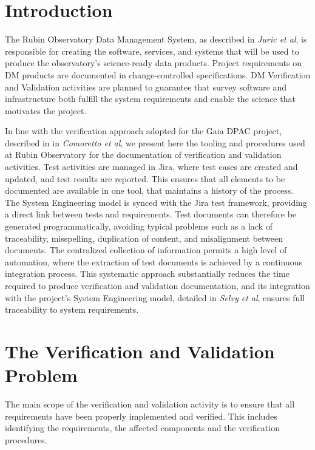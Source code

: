 \section{Introduction}

The Rubin Observatory Data Management System, as described in \textit{Juric et al}\cite{2015arXiv151207914J},
is responsible for creating the software, services, and systems that will be used to
produce the observatory's science-ready data products.  Project requirements on DM
products are documented in change-controlled specifications. DM Verification and Validation activities are planned
to guarantee that survey software and infrastructure both fulfill the system requirements and enable the science that
motivates the project.

In line with the verification approach adopted for the Gaia DPAC project, described in in \textit{Comoretto et al}\cite{10.1117/12.926797}, 
we present here the tooling and procedures used at Rubin Observatory for the documentation of verification and
validation activities. Test activities are managed in Jira, where test cases are created and updated, and test results
are reported. This ensures that all elements to be documented are available in one tool, that maintains a history of
the process. The System Engineering model is synced with the Jira test framework, providing a direct link between
tests and requirements. Test documents can therefore be generated programmatically, avoiding typical problems
such as a lack of traceability, misspelling, duplication of content, and misalignment between documents. The
centralized collection of information permits a high level of automation, where the extraction of test documents is
achieved by a continuous integration process. This systematic approach substantially reduces the time required to
produce verification and validation documentation, and its integration with the project's System Engineering model, 
detailed in \textit{Selvy et al}\cite{10.1117/12.2310125}, ensures full traceability to system requirements.


\section{The Verification and Validation Problem}

The main scope of the verification and validation activity is to ensure that all requirements have been properly implemented and verified.
This includes identifying the requirements, the affected components and the verification procedures.

